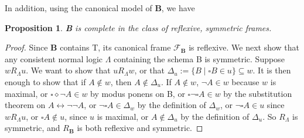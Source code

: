 \documentclass[12pt]{article}
\newtheorem{prop}{Proposition}
\begin{document}
In addition, using the canonical model of \textbf{B}, we have
\begin{prop} \textbf{B} is complete in the class of reflexive, symmetric frames. \end{prop}
\begin{proof}  Since \textbf{B} contains T, its canonical frame $\mathcal{F}_{\textbf{B}}$ is reflexive.  We next show that any consistent normal logic $\Lambda$ containing the schema B is symmetric.  Suppose $w R_{\Lambda} u$.  We want to show that $u R_{\Lambda} w$, or that $\Delta_u:=\lbrace B \mid \square B\in u\rbrace \subseteq w$.  It is then enough to show that if $A \notin w$, then $A\notin \Delta_u$.  If $A\notin w$, $\neg A \in w$ because $w$ is maximal, or $\square \diamond \neg A \in w$ by modus ponens on B, or $\square \neg \square A \in w$ by the substitution theorem on $A\leftrightarrow \neg \neg A$, or $\neg \square A \in \Delta_w$ by the definition of $\Delta_w$, or $\neg \square A \in u$ since $w R_{\Lambda} u$, or $\square A \notin u$, since $u$ is maximal, or $A\notin \Delta_u$ by the definition of $\Delta_u$.  So $R_{\Lambda}$ is symmetric, and $R_{\textbf{B}}$ is both reflexive and symmetric.
\end{proof}

\end{document}
